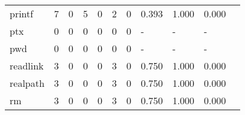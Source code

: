 \begin{longtable}{lp{1.2cm}p{1.2cm}p{1.2cm}p{1.2cm}p{1.2cm}p{1.2cm}p{1.2cm}p{1.2cm}p{1.2cm}p{1.2cm}}
printf    &                                     7 &                                                  0 &                                                  5 &                                                  0 &                                                  2 &                                                  0 &                                              0.393 &                                              1.000 &                                              0.000 \\
ptx       &                                     0 &                                                  0 &                                                  0 &                                                  0 &                                                  0 &                                                  0 &                                                  - &                                                  - &                                                  - \\
pwd       &                                     0 &                                                  0 &                                                  0 &                                                  0 &                                                  0 &                                                  0 &                                                  - &                                                  - &                                                  - \\
readlink  &                                     3 &                                                  0 &                                                  0 &                                                  0 &                                                  3 &                                                  0 &                                              0.750 &                                              1.000 &                                              0.000 \\
realpath  &                                     3 &                                                  0 &                                                  0 &                                                  0 &                                                  3 &                                                  0 &                                              0.750 &                                              1.000 &                                              0.000 \\
rm        &                                     3 &                                                  0 &                                                  0 &                                                  0 &                                                  3 &                                                  0 &                                              0.750 &                                              1.000 &                                              0.000 \\

\end{longtable}
